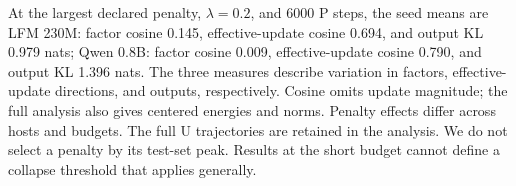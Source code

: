 At the largest declared penalty, $\lambda=0.2$, and 6000 P steps, the seed means are LFM 230M: factor cosine 0.145, effective-update cosine 0.694, and output KL 0.979 nats; Qwen 0.8B: factor cosine 0.009, effective-update cosine 0.790, and output KL 1.396 nats. The three measures describe variation in factors, effective-update directions, and outputs, respectively. Cosine omits update magnitude; the full analysis also gives centered energies and norms. Penalty effects differ across hosts and budgets. The full U trajectories are retained in the analysis. We do not select a penalty by its test-set peak. Results at the short budget cannot define a collapse threshold that applies generally.
